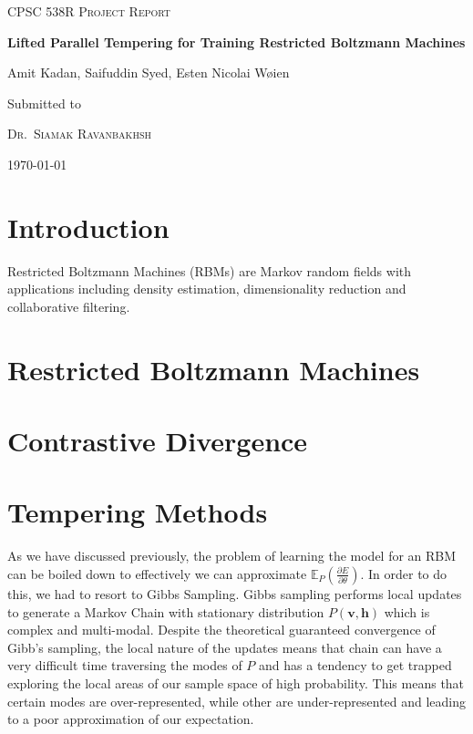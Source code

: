 \documentclass[12pt]{article}
\newcommand{\E}{{\mathbb{E}}}
\begin{document}
\begin{titlepage}
	\centering
	
	{\scshape \Large CPSC 538R Project Report
\par}
	\vspace{1cm}
	{\huge\bfseries Lifted Parallel Tempering for Training Restricted Boltzmann Machines
\par}
	\vspace{0.5cm}
	{\Large  Amit Kadan, Saifuddin Syed, Esten Nicolai W{\o}ien
\par}

	\vfill
	Submitted to\par
	{\scshape Dr.~Siamak Ravanbakhsh}\\
		{ \today\par}



\end{titlepage}

\tableofcontents
\newpage

\section{Introduction}
Restricted Boltzmann Machines (RBMs) are Markov random fields with applications including density estimation, 
dimensionality reduction and collaborative filtering.

\section{Restricted Boltzmann Machines}


\section{Contrastive Divergence}

\section{Tempering Methods}
As we have discussed previously, the problem of learning the model for an RBM can be boiled down to effectively we can approximate $\E_P\left(\frac{\partial E}{\partial \theta}\right)$. In order to do this, we had to resort to Gibbs Sampling. 
Gibbs sampling performs local updates to generate a Markov Chain with stationary distribution $P(\textbf{v},\textbf{h})$ which is complex and multi-modal. Despite the theoretical guaranteed convergence of Gibb's sampling, the local nature of the updates means that chain can have a very difficult time traversing the modes of $P$ and  has a tendency to get trapped exploring the local areas of our sample space of high probability. This means that certain modes are over-represented, while other are under-represented and leading to a poor approximation of our expectation.
\end{document}
